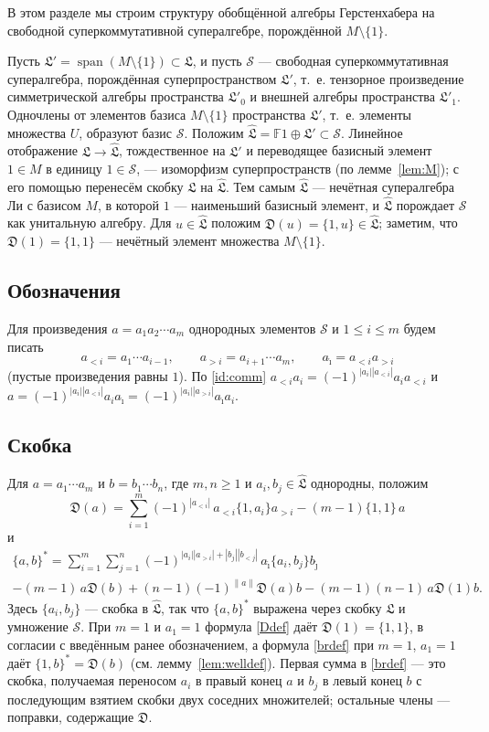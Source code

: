 \documentclass[11pt,reqno]{amsart}
\newcommand{\F}{\mathbb F}
\newcommand{\LL}{\mathfrak L}
\newcommand{\D}{\mathfrak D}
\newcommand{\Sm}{\mathcal S}
\newcommand{\Lh}{\widehat{\LL}}
\newcommand{\rp}[1]{\|#1\|}
\DeclareMathOperator{\spn}{span}
\theoremstyle{plain}
\theoremstyle{definition}
\theoremstyle{remark}
\begin{document}
В этом разделе мы строим структуру обобщённой алгебры Герстенхабера на свободной суперкоммутативной супералгебре, порождённой $M\setminus\{1\}$.

Пусть $\LL'=\spn(M\setminus\{1\})\subset\LL$, и пусть $\Sm$ --- свободная суперкоммутативная супералгебра, порождённая суперпространством $\LL'$, т.~е. тензорное произведение симметрической алгебры пространства $\LL'_0$ и внешней алгебры пространства $\LL'_1$.
Одночлены от элементов базиса $M\setminus\{1\}$ пространства $\LL'$, т.~е. элементы множества $U$, образуют базис $\Sm$.
Положим $\Lh=\F1\oplus\LL'\subset\Sm$.
Линейное отображение $\LL\to\Lh$, тождественное на $\LL'$ и переводящее базисный элемент $1\in M$ в единицу $1\in\Sm$, --- изоморфизм суперпространств (по лемме~\ref{lem:M}); с его помощью перенесём скобку $\LL$ на $\Lh$.
Тем самым $\Lh$ --- нечётная супералгебра Ли с базисом $M$, в которой $1$ --- наименьший базисный элемент, и $\Lh$ порождает $\Sm$ как унитальную алгебру.
Для $u\in\Lh$ положим $\D(u)=\{1,u\}\in\Lh$; заметим, что $\D(1)=\{1,1\}$ --- нечётный элемент множества $M\setminus\{1\}$.

\subsection*{Обозначения}
Для произведения $a=a_1a_2\cdots a_m$ однородных элементов $\Sm$ и $1\le i\le m$ будем писать
$$
a_{<i}=a_1\cdots a_{i-1},\qquad a_{>i}=a_{i+1}\cdots a_m,\qquad a_{\hat\imath}=a_{<i}a_{>i}
$$
(пустые произведения равны $1$).
По \eqref{id:comm} $a_{<i}a_i=(-1)^{|a_i||a_{<i}|}a_ia_{<i}$ и $a=(-1)^{|a_i||a_{<i}|}a_ia_{\hat\imath}=(-1)^{|a_i||a_{>i}|}a_{\hat\imath}a_i$.

\subsection*{Скобка}
Для $a=a_1\cdots a_m$ и $b=b_1\cdots b_n$, где $m,n\ge1$ и $a_i,b_j\in\Lh$ однородны, положим
\begin{equation}\label{Ddef}
\D(a)=\sum_{i=1}^m(-1)^{|a_{<i}|}\,a_{<i}\{1,a_i\}a_{>i}-(m-1)\{1,1\}\,a
\end{equation}
и
\begin{multline}\label{brdef}
\{a,b\}^*=\sum_{i=1}^m\sum_{j=1}^n(-1)^{|a_i||a_{>i}|+|b_j||b_{<j}|}\,a_{\hat\imath}\{a_i,b_j\}b_{\hat\jmath}\\
-(m-1)\,a\D(b)+(n-1)(-1)^{\rp a}\D(a)b-(m-1)(n-1)\,a\D(1)b .
\end{multline}
Здесь $\{a_i,b_j\}$ --- скобка в $\Lh$, так что $\{a,b\}^*$ выражена через скобку $\LL$ и умножение $\Sm$.
При $m=1$ и $a_1=1$ формула \eqref{Ddef} даёт $\D(1)=\{1,1\}$, в согласии с введённым ранее обозначением, а формула \eqref{brdef} при $m=1$, $a_1=1$ даёт $\{1,b\}^*=\D(b)$ (см. лемму~\ref{lem:welldef}).
Первая сумма в \eqref{brdef} --- это скобка, получаемая переносом $a_i$ в правый конец $a$ и $b_j$ в левый конец $b$ с последующим взятием скобки двух соседних множителей; остальные члены --- поправки, содержащие $\D$.
\end{document}
